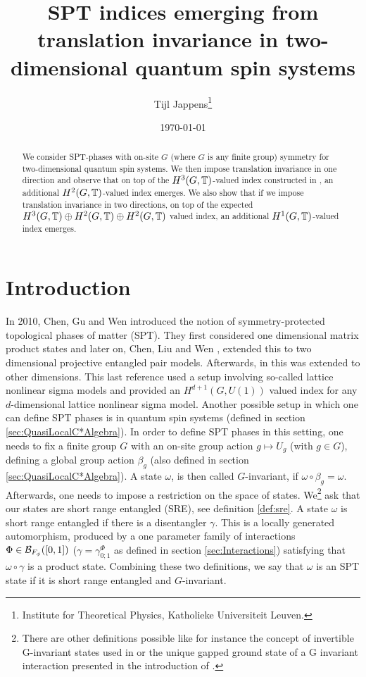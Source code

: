 \documentclass[11pt,a4paper,twoside]{article}
\title{SPT indices emerging from translation invariance in two-dimensional quantum spin systems}
\author{Tijl Jappens\footnote{Institute for Theoretical Physics, Katholieke Universiteit Leuven.}}
\date{\today}
\numberwithin{equation}{section}
\begin{document}
\maketitle 
\begin{abstract}
	We consider SPT-phases with on-site $G$ (where $G$ is any finite group) symmetry for two-dimensional quantum spin systems. We then impose translation invariance in one direction and observe that on top of the $H^3(G,\mathbb T)$-valued index constructed in \cite{ogata2021h3gmathbb}, an additional $H^2(G,\mathbb T)$-valued index emerges. We also show that if we impose translation invariance in two directions, on top of the expected $H^3(G,\mathbb T)\oplus H^2(G,\mathbb T)\oplus H^2(G,\mathbb T)$ valued index, an additional $H^1(G,\mathbb T)$-valued index emerges.
\end{abstract}
\section{Introduction}
In 2010, Chen, Gu and Wen \cite{chen_gu_wen_2011} introduced the notion of symmetry-protected topological phases of matter (SPT). They first considered one dimensional matrix product states and later on, Chen, Liu and Wen \cite{Chen_2011}, extended this to two dimensional projective entangled pair models. Afterwards, in \cite{Chen_2013} this was extended to other dimensions. This last reference used a setup involving so-called lattice nonlinear sigma models and provided an $H^{d+1}(G,U(1))$ valued index for any $d$-dimensional lattice nonlinear sigma model. Another possible setup in which one can define SPT phases is in quantum spin systems (defined in section \ref{sec:QuasiLocalC*Algebra}). In order to define SPT phases in this setting, one needs to fix a finite group $G$ with an on-site group action $g\mapsto U_g$ (with $g\in G$), defining a global group action $\beta_g$ (also defined in section \ref{sec:QuasiLocalC*Algebra}). A state $\omega$, is then called $G$-invariant, if $\omega\circ\beta_g=\omega$. Afterwards, one needs to impose a restriction on the space of states. We\footnote{There are other definitions possible like for instance the concept of invertible G-invariant states used in \cite{kapustin2021classification} or the unique gapped ground state of a G invariant interaction presented in the introduction of \cite{ogata2021h3gmathbb}.} ask that our states are short range entangled (SRE), see definition \ref{def:sre}. A state $\omega$ is short range entangled if there is a disentangler $\gamma$. This is a locally generated automorphism, produced by a one parameter family of interactions $\Phi\in\mathcal B_{F_\phi}([0,1])$ ($\gamma=\gamma_{0;1}^\Phi$ as defined in section \ref{sec:Interactions}) satisfying that $\omega\circ\gamma$ is a product state. Combining these two definitions, we say that $\omega$ is an SPT state if it is short range entangled and $G$-invariant.
\end{document}
